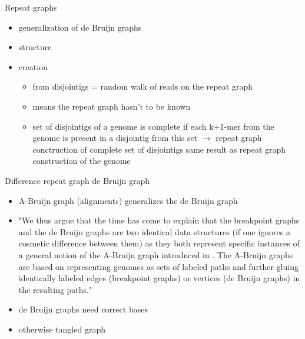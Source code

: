 \documentclass{beamer}
\begin{document}
  \begin{frame}{Repeat graphs}
    \begin{itemize}
      \item generalization of de Bruijn graphs

      \item structure

      \item creation
      
      \begin{itemize}

        \item from disjointigs = random walk of reads on the repeat graph 
      
        \item means the repeat graph hasn't to be known
        \item set of disjointigs of a genome is complete if each k+1-mer from the genome is present in a disjointig from this set $\rightarrow$ repeat graph conctruction of complete set of disjointigs same result as repeat graph construction of the genome
      \end{itemize}
    \end{itemize}
  \end{frame}

  \begin{frame}{Difference repeat graph de Bruijn graph}
    \begin{itemize}
      \item A-Bruijn graph (alignments) generalizes the de Bruijn graph

      \item "We thus argue that the time has come to explain that the breakpoint graphs and the de Bruijn graphs are two identical data structures (if one ignores a cosmetic difference between them) as they both represent specific instances of a general notion of the A-Bruijn graph introduced in \cite{lin_what_2014}. The A-Bruijn graphs are based on representing genomes as sets of labeled paths and further gluing identically labeled edges (breakpoint graphs) or vertices (de Bruijn graphs) in the resulting paths." \cite{pevzner_novo_2004}

      \item de Bruijn graphs need correct bases
      
      \item otherwise tangled graph
    \end{itemize}
  \end{frame}
\end{document}
